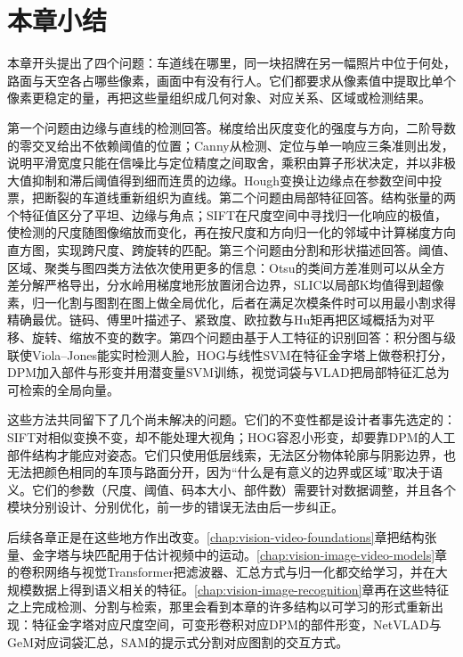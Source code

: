 \section{本章小结}
\label{sec:vision-features-summary}

本章开头提出了四个问题：车道线在哪里，同一块招牌在另一幅照片中位于何处，路面与天空各占哪些像素，画面中有没有行人。它们都要求从像素值中提取比单个像素更稳定的量，再把这些量组织成几何对象、对应关系、区域或检测结果。

第一个问题由边缘与直线的检测回答。梯度给出灰度变化的强度与方向，二阶导数的零交叉给出不依赖阈值的位置；Canny从检测、定位与单一响应三条准则出发，说明平滑宽度只能在信噪比与定位精度之间取舍，乘积由算子形状决定，并以非极大值抑制和滞后阈值得到细而连贯的边缘。Hough变换让边缘点在参数空间中投票，把断裂的车道线重新组织为直线。第二个问题由局部特征回答。结构张量的两个特征值区分了平坦、边缘与角点；SIFT在尺度空间中寻找归一化响应的极值，使检测的尺度随图像缩放而变化，再在按尺度和方向归一化的邻域中计算梯度方向直方图，实现跨尺度、跨旋转的匹配。第三个问题由分割和形状描述回答。阈值、区域、聚类与图四类方法依次使用更多的信息：Otsu的类间方差准则可以从全方差分解严格导出，分水岭用梯度地形放置闭合边界，SLIC以局部K均值得到超像素，归一化割与图割在图上做全局优化，后者在满足次模条件时可以用最小割求得精确最优。链码、傅里叶描述子、紧致度、欧拉数与Hu矩再把区域概括为对平移、旋转、缩放不变的数字。第四个问题由基于人工特征的识别回答：积分图与级联使Viola–Jones能实时检测人脸，HOG与线性SVM在特征金字塔上做卷积打分，DPM加入部件与形变并用潜变量SVM训练，视觉词袋与VLAD把局部特征汇总为可检索的全局向量。

这些方法共同留下了几个尚未解决的问题。它们的不变性都是设计者事先选定的：SIFT对相似变换不变，却不能处理大视角；HOG容忍小形变，却要靠DPM的人工部件结构才能应对姿态。它们只使用低层线索，无法区分物体轮廓与阴影边界，也无法把颜色相同的车顶与路面分开，因为“什么是有意义的边界或区域”取决于语义。它们的参数（尺度、阈值、码本大小、部件数）需要针对数据调整，并且各个模块分别设计、分别优化，前一步的错误无法由后一步纠正。

后续各章正是在这些地方作出改变。\ref{chap:vision-video-foundations}章把结构张量、金字塔与块匹配用于估计视频中的运动。\ref{chap:vision-image-video-models}章的卷积网络与视觉Transformer把滤波器、汇总方式与归一化都交给学习，并在大规模数据上得到语义相关的特征。\ref{chap:vision-image-recognition}章再在这些特征之上完成检测、分割与检索，那里会看到本章的许多结构以可学习的形式重新出现：特征金字塔对应尺度空间，可变形卷积对应DPM的部件形变，NetVLAD与GeM对应词袋汇总，SAM的提示式分割对应图割的交互方式。

